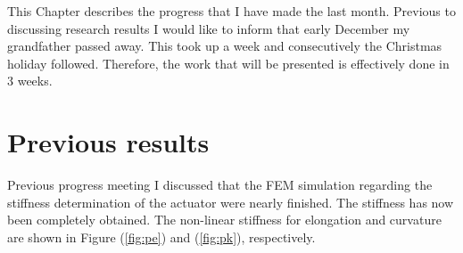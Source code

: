 This Chapter describes the progress that I have made the last month. Previous to discussing research results I would like to inform that early December my grandfather passed away. This took up a week and consecutively the Christmas holiday followed. Therefore, the work that will be presented is effectively done in 3 weeks. 

\section{Previous results}

Previous progress meeting I discussed that the FEM simulation regarding the stiffness determination of the actuator were nearly finished. The stiffness has now been completely obtained. The non-linear stiffness for elongation and curvature are shown in Figure (\ref{fig:pe}) and (\ref{fig:pk}), respectively.

